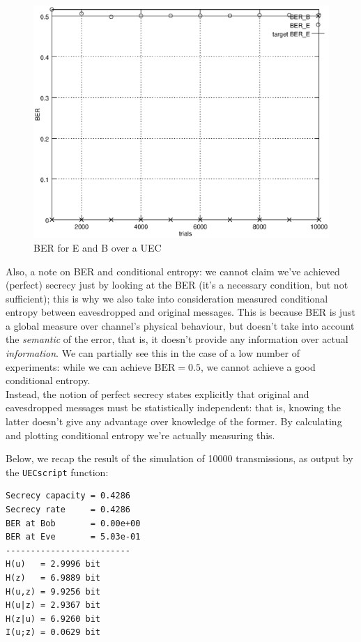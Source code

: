 \documentclass[a4paper,12pt,titlepage]{article}
\begin{document}
\begin{figure}[h]
  \centering
  \includegraphics[scale=0.8]{uec_ber.eps}
  \caption{BER for E and B over a UEC}
  \label{fig:uec_ber}
\end{figure}

Also, a note on BER and conditional entropy: we cannot claim we've achieved
(perfect) secrecy just by looking at the BER (it's a necessary condition, but
not sufficient); this is why we also take into
consideration measured conditional entropy between eavesdropped and original
messages. This is because BER is just a global measure over channel's physical
behaviour, but doesn't take into account the \emph{semantic} of the error, that
is, it doesn't provide any information over actual \emph{information}. We can
partially see this in the case of a low number of experiments: while we can
achieve $\text{BER} = 0.5$, we cannot achieve a good conditional entropy. \\
Instead, the notion of perfect secrecy states explicitly that original and
eavesdropped messages must be statistically independent: that is, knowing the
latter doesn't give any advantage over knowledge of the former. By calculating
and plotting conditional entropy we're actually measuring this.

Below, we recap the result of the simulation of 10000 transmissions, as output
by the \texttt{UECscript} function:

\begin{verbatim}
Secrecy capacity = 0.4286
Secrecy rate     = 0.4286
BER at Bob       = 0.00e+00
BER at Eve       = 5.03e-01
-------------------------
H(u)   = 2.9996 bit
H(z)   = 6.9889 bit
H(u,z) = 9.9256 bit
H(u|z) = 2.9367 bit
H(z|u) = 6.9260 bit
I(u;z) = 0.0629 bit
\end{verbatim}
\end{document}

